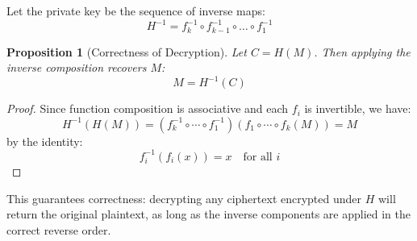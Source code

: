 \documentclass[12pt]{article}
\newtheorem{proposition}{Proposition}
\begin{document}
Let the private key be the sequence of inverse maps:
\[
H^{-1} = f_k^{-1} \circ f_{k-1}^{-1} \circ \dots \circ f_1^{-1}
\]

\begin{proposition}[Correctness of Decryption]
Let \( C = H(M) \). Then applying the inverse composition recovers \( M \):
\[
M = H^{-1}(C)
\]
\end{proposition}

\begin{proof}
Since function composition is associative and each \( f_i \) is invertible, we have:
\[
H^{-1}(H(M)) = (f_k^{-1} \circ \cdots \circ f_1^{-1})(f_1 \circ \cdots \circ f_k(M)) = M
\]
by the identity:
\[
f_i^{-1}(f_i(x)) = x \quad \text{for all } i
\]
\end{proof}

This guarantees correctness: decrypting any ciphertext encrypted under \( H \) will return the original plaintext, as long as the inverse components are applied in the correct reverse order.

\begin{center}
\noindent
\setlength{\fboxsep}{10pt}
\end{center}
\end{document}
